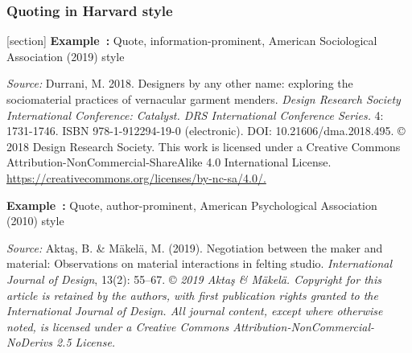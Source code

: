 \documentclass[english, 12pt, a4paper, biz, utf8, a-2b, online]{aaltothesis}
\begin{document}
\subsubsection*{Quoting in Harvard style}

[section]
\textsf{\textbf{Example~\theexample:}} Quote, information-prominent, American 
Sociological Association (2019) style

\vspace{1ex}
\noindent
{}

\vspace{1ex}
\noindent
\textit{Source:} Durrani, M. 2018. Designers by any other name: exploring the 
sociomaterial practices of vernacular garment menders. \textit{Design Research 
Society International Conference: Catalyst. DRS International Conference 
Series.} 4: 1731-1746. ISBN 978-1-912294-19-0 (electronic). 
DOI: 10.21606/dma.2018.495. \copyright{} 2018 Design Research Society. This work
is licensed under a Creative Commons Attribution-NonCommercial-ShareAlike 4.0 
International License. \url{https://creativecommons.org/licenses/by-nc-sa/4.0/.}

\vspace{1em}
\noindent
{}
\textsf{\textbf{Example~\theexample:}} Quote, author-prominent, American 
Psychological Association (2010) style

\vspace{1ex}
\noindent
{}

\vspace{1ex}
\noindent
\textit{Source:} Aktaş, B. \& Mäkelä, M. (2019). Negotiation between the maker 
and material: Observations on material interactions in felting studio. 
\textit{International Journal of Design}, 13(2): 55--67. \copyright{} 
\textit{2019 Aktaş \& Mäkelä. Copyright for this article is retained by the 
	authors, with first publication rights granted to the International Journal 
	of Design. All journal content, except where otherwise noted, is licensed 
	under a Creative Commons Attribution-NonCommercial-NoDerivs 2.5 License.}
\end{document}
